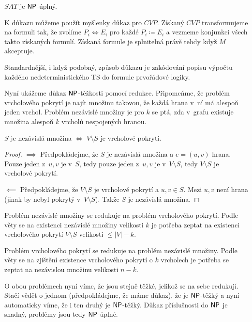 \pagebreak

\begin{theorem}
    $SAT$ je ${\mathsf{NP}}$-úplný.
\end{theorem}

K důkazu můžeme použít myšlenky důkaz pro $CVP$.
Získaný $CVP$ transformujeme na formuli tak, že zvolíme
$P_i \Leftrightarrow E_i$ pro každé $P_i \coloneqq E_i$
a vezmeme konjunkci všech takto získaných formulí. Získaná formule je
splnitelná právě tehdy když $M$ akceptuje.

Standardnější, i když podobný, způsob důkazu je zakódování popisu
výpočtu každého nedeterministického TS do formule prvořádové logiky.


Nyní ukážeme důkaz ${\mathsf{NP}}$-těžkosti pomocí redukce. Připomeňme, že problém
vrcholového pokrytí je najít množinu takovou, že každá hrana v~ní má
alespoň jeden vrchol. Problém nezávislé množiny je pro $k$ se ptá, zda
v~grafu existuje množina alespoň $k$ vrcholů nespojených hranou.

\begin{theorem}
    $S$ je nezávislá množina $\iff$ $V \setminus S$ je vrcholové
    pokrytí.
\end{theorem}

\begin{proof}
$\implies$ Předpokládejme, že $S$ je nezávislá množina
a $e = (u,v)$ hrana. Pouze jeden z~$u,v$ je v~$S$,
tedy pouze jeden z~$u,v$ je v~$V \setminus S$, tedy $V \setminus S$ je
vrcholové pokrytí.

$\impliedby$ Předpokládejme, že $V \setminus S$ je vrcholové pokrytí
a $u, v \in S$. Mezi $u,v$ není hrana (jinak by nebyl pokrytý
v~$V \setminus S$). Takže $S$ je nezávislá množina.
\end{proof}

Problém nezávislé množiny se redukuje na problém vrcholového pokrytí.
Podle věty se na existenci nezávislé množiny velikosti $k$
je potřeba zeptat na existenci vrcholového pokrytí
$V \setminus S$ velikosti $ \leq \lvert V \rvert - k$.

Problém vrcholového pokrytí se redukuje na problém nezávislé množiny.
Podle věty se na zjištění existence vrcholového pokrytí o $k$ vrcholech
je potřeba se zeptat na nezávislou množinu velikosti $n-k$.

O obou problémech nyní víme, že jsou stejně těžké, jelikož se na sebe
redukují. Stačí vědět o jednom (předpokládejme, že máme důkaz), že je
${\mathsf{NP}}$-těžký a nyní automaticky víme, že i ten druhý je ${\mathsf{NP}}$-těžký.
Důkaz příslušnosti do ${\mathsf{NP}}$ je snadný, problémy jsou tedy ${\mathsf{NP}}$-úplné.

